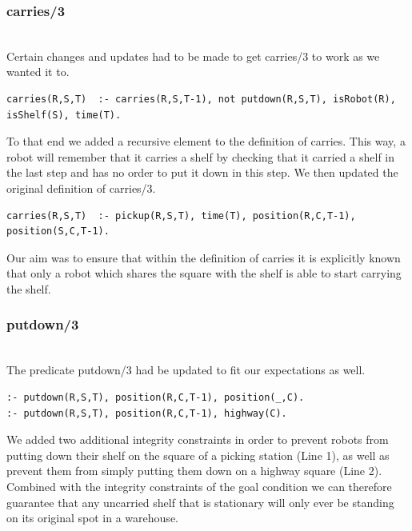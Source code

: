\documentclass{llncs}
\begin{document}
\subsubsection{carries/3}\hfill\\
Certain changes and updates had to be made to get carries/3 to work as we wanted it to.
\begin{lstlisting}[basicstyle=\fontsize{9}{11}\selectfont\ttfamily,frame=single,breaklines=true]
carries(R,S,T)  :- carries(R,S,T-1), not putdown(R,S,T), isRobot(R), isShelf(S), time(T).
\end{lstlisting}
To that end we added a recursive element to the definition of carries. This way, a robot will remember that it carries a shelf by checking that it carried a shelf in the last step and has no order to put it down in this step.
We then updated the original definition of carries/3.
\begin{lstlisting}[basicstyle=\fontsize{9}{11}\selectfont\ttfamily,frame=single,breaklines=true]
carries(R,S,T)  :- pickup(R,S,T), time(T), position(R,C,T-1), position(S,C,T-1).
\end{lstlisting}
Our aim was to ensure that within the definition of carries it is explicitly known that only a robot which shares the square with the shelf is able to start carrying the shelf.

\subsubsection{putdown/3}\hfill\\
The predicate putdown/3 had be updated to fit our expectations as well.
\begin{lstlisting}[basicstyle=\fontsize{9}{11}\selectfont\ttfamily,frame=single,breaklines=true]
:- putdown(R,S,T), position(R,C,T-1), position(_,C).
:- putdown(R,S,T), position(R,C,T-1), highway(C).
\end{lstlisting}
We added two additional integrity constraints in order to prevent robots from putting down their shelf on the square of a picking station (Line 1), as well as prevent them from simply putting them down on a highway square (Line 2). Combined with the integrity constraints of the goal condition we can therefore guarantee that any uncarried shelf that is stationary will only ever be standing on its original spot in a warehouse.
\end{document}
